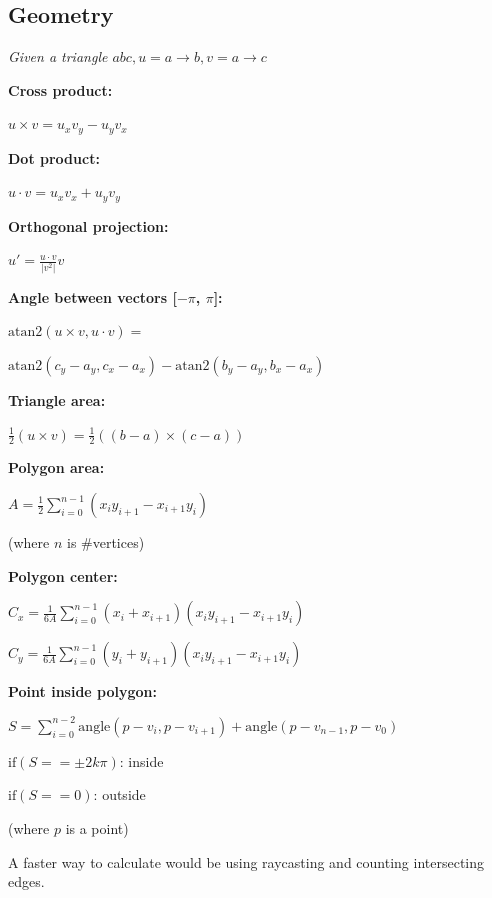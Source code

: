 \documentclass[8pt,a4paper,landscape,oneside]{amsart}
\begin{document}
\begin{multicols*}{3}
  \subsection{Geometry}
  \textit{Given a triangle $\mathit{abc, u = a \rightarrow b, v = a \rightarrow c}$}

  \textbf{Cross product:} 

  $u \times v = u_xv_y - u_yv_x$
  \newline

  \textbf{Dot product:} 

  $u \cdot v = u_xv_x + u_yv_y$
  \newline

  \textbf{Orthogonal projection:} 

  $u' = \frac{u \cdot v}{|v^2|}v$
  \newline

  \textbf{Angle between vectors [$-\pi$, $\pi$]:} 

  $\mathrm{atan2} (u \times v, u \cdot v) = $

  $\mathrm{atan2} (c_y - a_y, c_x - a_x) - \mathrm{atan2} (b_y - a_y, b_x - a_x)$
  \newline

  \textbf{Triangle area:} 

  $\frac{1}{2}(u \times v) = \frac{1}{2}((b-a) \times (c-a))$
  \newline

  \textbf{Polygon area:} 

  $A = \frac{1}{2}\sum\limits^{n-1}_{i=0}(x_iy_{i+1}-x_{i+1}y_i)$

  (where $n$ is \#vertices)
  \newline

  \textbf{Polygon center:}

  $C_x = \frac{1}{6A}\sum\limits^{n-1}_{i=0}(x_i+x_{i+1})(x_iy_{i+1}-x_{i+1}y_i)$

  $C_y = \frac{1}{6A}\sum\limits^{n-1}_{i=0}(y_i+y_{i+1})(x_iy_{i+1}-x_{i+1}y_i)$
  \newline

  \textbf{Point inside polygon:} 

  $S = \sum\limits^{n-2}_{i=0}\mathrm{angle}(p - v_i, p - v_{i+1}) + \mathrm{angle}(p - v_{n-1}, p - v_0)$

  $\mathrm{if} (S == \pm 2k\pi)$: inside

  $\mathrm{if} (S == 0)$: outside

  (where $p$ is a point)

  A faster way to calculate would be using raycasting and counting intersecting edges.
  \newline
  

\end{multicols*}
\end{document}
